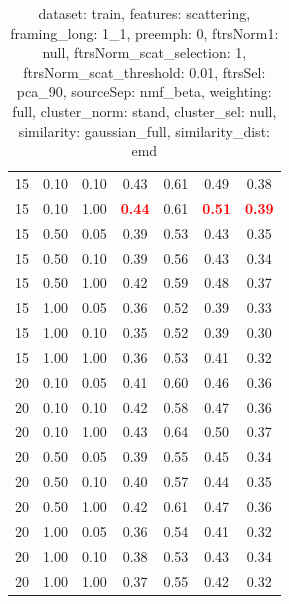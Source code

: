 \documentclass[12pt,a4paper,fleqn]{tufte-handout}
\begin{document}
\begin{table}
\begin{center}
\begin{tabular}{lllcccc}
15 & 0.10 & 0.10 & 0.43 & 0.61 & 0.49 & 0.38 \\                         
15 & 0.10 & 1.00 & \textbf{\textcolor{red}{0.44}} & 0.61 & \textbf{\textcolor{red}{0.51}} & \textbf{\textcolor{red}{0.39}} \\                         
15 & 0.50 & 0.05 & 0.39 & 0.53 & 0.43 & 0.35 \\                         
15 & 0.50 & 0.10 & 0.39 & 0.56 & 0.43 & 0.34 \\                         
15 & 0.50 & 1.00 & 0.42 & 0.59 & 0.48 & 0.37 \\                         
15 & 1.00 & 0.05 & 0.36 & 0.52 & 0.39 & 0.33 \\                         
15 & 1.00 & 0.10 & 0.35 & 0.52 & 0.39 & 0.30 \\                         
15 & 1.00 & 1.00 & 0.36 & 0.53 & 0.41 & 0.32 \\                         
20 & 0.10 & 0.05 & 0.41 & 0.60 & 0.46 & 0.36 \\                         
20 & 0.10 & 0.10 & 0.42 & 0.58 & 0.47 & 0.36 \\                         
20 & 0.10 & 1.00 & 0.43 & 0.64 & 0.50 & 0.37 \\                         
20 & 0.50 & 0.05 & 0.39 & 0.55 & 0.45 & 0.34 \\                         
20 & 0.50 & 0.10 & 0.40 & 0.57 & 0.44 & 0.35 \\                         
20 & 0.50 & 1.00 & 0.42 & 0.61 & 0.47 & 0.36 \\                         
20 & 1.00 & 0.05 & 0.36 & 0.54 & 0.41 & 0.32 \\                         
20 & 1.00 & 0.10 & 0.38 & 0.53 & 0.43 & 0.34 \\                         
20 & 1.00 & 1.00 & 0.37 & 0.55 & 0.42 & 0.32 \\                         
\end{tabular}                         
\end{center}                         
\caption{dataset: train, features: scattering, framing\_long: 1\_1, preemph: 0, ftrsNorm1: null, ftrsNorm\_scat\_selection: 1, ftrsNorm\_scat\_threshold: 0.01, ftrsSel: pca\_90, sourceSep: nmf\_beta, weighting: full, cluster\_norm: stand, cluster\_sel: null, similarity: gaussian\_full, similarity\_dist: emd}                         
\label{datasetrFeaturscFraminlong1_1Preemp0Ftrsnorm1nuFtrsnoscatselect1Ftrsnoscatthresh0.01Ftrsselpc90SourcesepnmbeWeightfuClustenormstClusteselnuSimilagafuSimiladistem}                         
\end{table}                         
 
\end{document}
